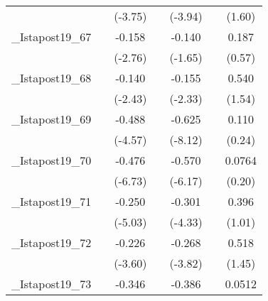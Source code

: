 {\begin{tabular}{l*{6}{c}}
            &                     &     (-3.75)         &                     &     (-3.94)         &                     &      (1.60)         \\
[1em]
\_Istapost19\_67&                     &      -0.158\sym{**} &                     &      -0.140         &                     &       0.187         \\
            &                     &     (-2.76)         &                     &     (-1.65)         &                     &      (0.57)         \\
[1em]
\_Istapost19\_68&                     &      -0.140\sym{*}  &                     &      -0.155\sym{*}  &                     &       0.540         \\
            &                     &     (-2.43)         &                     &     (-2.33)         &                     &      (1.54)         \\
[1em]
\_Istapost19\_69&                     &      -0.488\sym{***}&                     &      -0.625\sym{***}&                     &       0.110         \\
            &                     &     (-4.57)         &                     &     (-8.12)         &                     &      (0.24)         \\
[1em]
\_Istapost19\_70&                     &      -0.476\sym{***}&                     &      -0.570\sym{***}&                     &      0.0764         \\
            &                     &     (-6.73)         &                     &     (-6.17)         &                     &      (0.20)         \\
[1em]
\_Istapost19\_71&                     &      -0.250\sym{***}&                     &      -0.301\sym{***}&                     &       0.396         \\
            &                     &     (-5.03)         &                     &     (-4.33)         &                     &      (1.01)         \\
[1em]
\_Istapost19\_72&                     &      -0.226\sym{***}&                     &      -0.268\sym{***}&                     &       0.518         \\
            &                     &     (-3.60)         &                     &     (-3.82)         &                     &      (1.45)         \\
[1em]
\_Istapost19\_73&                     &      -0.346\sym{***}&                     &      -0.386\sym{***}&                     &      0.0512         \\

\end{tabular}}
